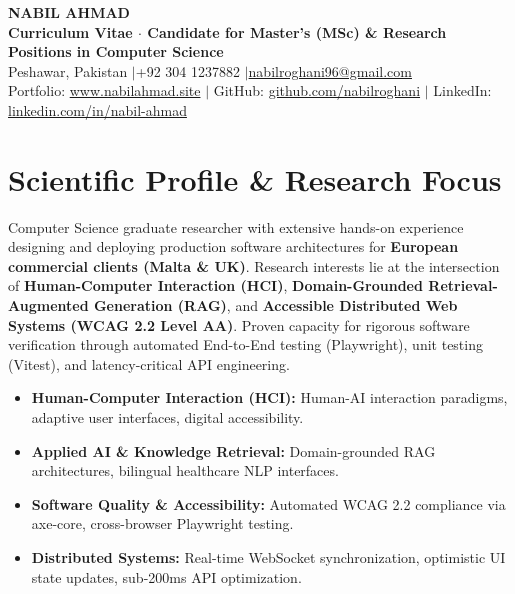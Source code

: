 \documentclass[10pt,a4paper]{article}
\begin{document}
\pagestyle{empty}

\begin{center}
    {\Huge \textbf{NABIL AHMAD}} \\[4pt]
    \textbf{Curriculum Vitae $\cdot$ Candidate for Master’s (MSc) \& Research Positions in Computer Science} \\[3pt]
    Peshawar, Pakistan \quad$|$\quad +92 304 1237882 \quad$|$\quad \href{mailto:nabilroghani96@gmail.com}{nabilroghani96@gmail.com} \\[2pt]
    Portfolio: \href{https://www.nabilahmad.site}{www.nabilahmad.site} \quad$|$\quad
    GitHub: \href{https://github.com/nabilroghani}{github.com/nabilroghani} \quad$|$\quad
    LinkedIn: \href{https://linkedin.com/in/nabil-ahmad-0750002b1}{linkedin.com/in/nabil-ahmad}
\end{center}

\section{Scientific Profile \& Research Focus}
Computer Science graduate researcher with extensive hands-on experience designing and deploying production software architectures for \textbf{European commercial clients (Malta \& UK)}. Research interests lie at the intersection of \textbf{Human-Computer Interaction (HCI)}, \textbf{Domain-Grounded Retrieval-Augmented Generation (RAG)}, and \textbf{Accessible Distributed Web Systems (WCAG 2.2 Level AA)}. Proven capacity for rigorous software verification through automated End-to-End testing (Playwright), unit testing (Vitest), and latency-critical API engineering.

\begin{itemize}
    \item \textbf{Human-Computer Interaction (HCI):} Human-AI interaction paradigms, adaptive user interfaces, digital accessibility.
    \item \textbf{Applied AI \& Knowledge Retrieval:} Domain-grounded RAG architectures, bilingual healthcare NLP interfaces.
    \item \textbf{Software Quality \& Accessibility:} Automated WCAG 2.2 compliance via axe-core, cross-browser Playwright testing.
    \item \textbf{Distributed Systems:} Real-time WebSocket synchronization, optimistic UI state updates, sub-200ms API optimization.
\end{itemize}
\end{document}
